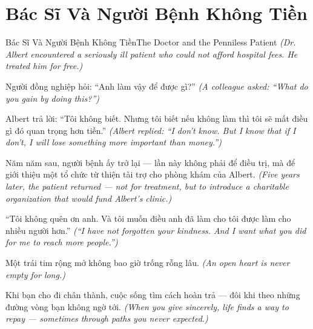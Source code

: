 \section{Bác Sĩ Và Người Bệnh Không Tiền}
\begin{truyen}{Bác Sĩ Và Người Bệnh Không Tiền}{The Doctor and the Penniless Patient}
\textit{(Dr. Albert encountered a seriously ill patient who could not afford hospital fees. He treated him for free.)}

Người đồng nghiệp hỏi: ``Anh làm vậy để được gì?''
\textit{(A colleague asked: ``What do you gain by doing this?'')}

Albert trả lời: ``Tôi không biết. Nhưng tôi biết nếu không làm thì tôi sẽ mất điều gì đó quan trọng hơn tiền.''
\textit{(Albert replied: ``I don't know. But I know that if I don't, I will lose something more important than money.'')}

Năm năm sau, người bệnh ấy trở lại — lần này không phải để điều trị, mà để giới thiệu một tổ chức từ thiện tài trợ cho phòng khám của Albert.
\textit{(Five years later, the patient returned — not for treatment, but to introduce a charitable organization that would fund Albert's clinic.)}

``Tôi không quên ơn anh. Và tôi muốn điều anh đã làm cho tôi được làm cho nhiều người hơn.''
\textit{(``I have not forgotten your kindness. And I want what you did for me to reach more people.'')}

Một trái tim rộng mở không bao giờ trống rỗng lâu.
\textit{(An open heart is never empty for long.)}

\end{truyen}

\begin{baihoc}
Khi bạn cho đi chân thành, cuộc sống tìm cách hoàn trả — đôi khi theo những đường vòng bạn không ngờ tới.
\textit{(When you give sincerely, life finds a way to repay — sometimes through paths you never expected.)}
\end{baihoc}
\ngancach

